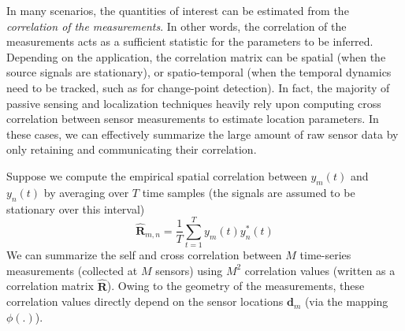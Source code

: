 In many scenarios, the quantities of interest can be estimated from the {\em correlation of the measurements}. In other words, the correlation of the measurements acts as a sufficient statistic for the parameters to be inferred. Depending on the application, the correlation matrix can be spatial (when the source signals are stationary), or spatio-temporal (when the temporal dynamics need to be tracked, such as for change-point detection). In fact, the majority of passive sensing and localization techniques heavily rely upon computing cross correlation between sensor measurements to estimate location parameters. In these cases, we can effectively summarize the large amount of raw sensor data by only retaining and communicating their correlation. 

 Suppose we compute the empirical spatial correlation between $y_m(t)$ and $y_n(t)$  by averaging over $T$ time samples (the signals are assumed to be stationary over this interval) %
\begin{equation}
\mathbf{\hat{R}}_{m,n} = \frac{1}{T}\sum_{t=1}^{T} y_m (t) y^*_n (t)  \label{eq:corr}
\end{equation} 
We can summarize the self and cross correlation between $M$ time-series measurements (collected at $M$ sensors) using $M^2$ correlation values (written as a correlation matrix $\mathbf{\hat{R}}$). Owing to the geometry of the measurements, these correlation values directly depend on the sensor locations $\mathbf{d}_m$  (via the mapping $\phi(.)$). 

